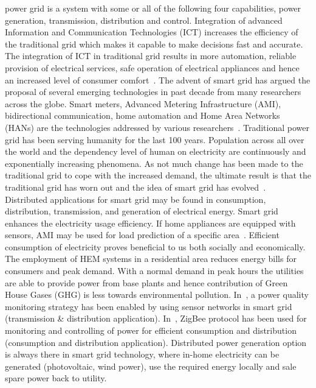 \documentclass[journal]{IEEEtran}
\begin{document}
 power grid is a system with some or all of the following four capabilities, power generation, transmission, distribution and control. Integration of advanced Information and Communication Technologies (ICT) increases the efficiency of the traditional grid which makes it capable to make decisions fast and accurate. The integration of ICT in traditional grid results in more automation, reliable provision of electrical services, safe operation of electrical appliances and hence an increased level of consumer comfort~\cite{khan2013home}. The advent of smart grid has argued the proposal of several emerging technologies in past decade from many researchers across the globe. Smart meters, Advanced Metering Infrastructure (AMI), bidirectional communication, home automation and Home Area Networks (HANs) are the technologies addressed by various researchers~\cite{erol2011wireless}. Traditional power grid has been serving humanity for the last 100 years. Population across all over the world and the dependency level of human on electricity are continuously and exponentially increasing phenomena. As not much change has been made to the traditional grid to cope with the increased demand, the ultimate result is that the traditional grid has worn out and the idea of smart grid has evolved~\cite{kailas2012survey}.\\
\indent Distributed applications for smart grid may be found  in  consumption, distribution, transmission, and generation of electrical energy. Smart grid enhances the electricity usage efficiency. If home appliances are equipped with sensors, AMI may be used for load prediction of a specific area~\cite{anas2012minimizing}. Efficient consumption of electricity proves beneficial to us both socially and economically. The employment of HEM systems in a residential area reduces energy bills for consumers and peak demand. With a normal demand in peak hours the utilities are able to provide power from base plants and hence contribution of Green House Gases (GHG) is less towards environmental pollution. In~\cite{di2009cooperative}, a power quality monitoring strategy has been enabled by using sensor networks in smart grid (transmission \& distribution application). In~\cite{javaid2012monitoring}, ZigBee  protocol has been used for monitoring and controlling of power for efficient consumption and distribution (consumption and distribution application). Distributed power generation option is always there in smart grid technology, where in-home electricity can be generated (photovoltaic, wind power), use the required energy locally and sale spare power back to utility.\\
\end{document}

